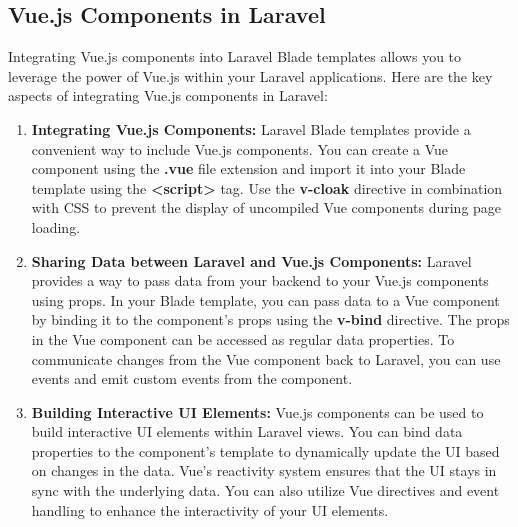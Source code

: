 \subsection{Vue.js Components in Laravel}
Integrating Vue.js components into Laravel Blade templates allows you to leverage the power of Vue.js within your Laravel applications. Here are the key aspects of integrating Vue.js components in Laravel:
\begin{enumerate}
    \item \textbf{Integrating Vue.js Components:}
        Laravel Blade templates provide a convenient way to include Vue.js components.
        You can create a Vue component using the \textbf{.vue} file extension and import it into your Blade template using the \textbf{\textless script\textgreater}  tag.
        Use the \textbf{v-cloak} directive in combination with CSS to prevent the display of uncompiled Vue components during page loading.

    \item \textbf{Sharing Data between Laravel and Vue.js Components:}
        Laravel provides a way to pass data from your backend to your Vue.js components using props.
        In your Blade template, you can pass data to a Vue component by binding it to the component's props using the \textbf{v-bind} directive.
        The props in the Vue component can be accessed as regular data properties.
        To communicate changes from the Vue component back to Laravel, you can use events and emit custom events from the component.

    \item \textbf{Building Interactive UI Elements:}
        Vue.js components can be used to build interactive UI elements within Laravel views.
        You can bind data properties to the component's template to dynamically update the UI based on changes in the data.
        Vue's reactivity system ensures that the UI stays in sync with the underlying data.
        You can also utilize Vue directives and event handling to enhance the interactivity of your UI elements.
\end{enumerate}

